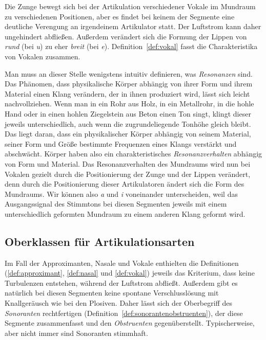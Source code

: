 Die Zunge bewegt sich bei der Artikulation verschiedener Vokale im Mund\-raum zu verschiedenen Positionen, aber es findet bei keinem der Segmente eine deutliche Verengung an irgendeinem Artikulator statt.
Der Luftstrom kann daher ungehindert abfließen.
Außerdem verändert sich die Formung der Lippen von \textit{rund} (\zB bei \textit{u}) zu eher \textit{breit} (\zB bei \textit{e}).
Definition~\ref{def:vokal} fasst die Charakteristika von Vokalen zusammen.


Man muss an dieser Stelle wenigstens intuitiv definieren, was \textit{Resonanzen} sind.
Das Phänomen, dass physikalische Körper abhängig von ihrer Form und ihrem Material einen Klang verändern, der in ihnen produziert wird, lässt sich leicht nachvollziehen.
Wenn man in ein Rohr aus Holz, in ein Metallrohr, in die hohle Hand oder in einen hohlen Ziegelstein aus Beton einen Ton singt, klingt dieser jeweils unterschiedlich, auch wenn die zugrundeliegende Tonhöhe gleich bleibt.
Das liegt daran, dass ein physikalischer Körper abhängig von seinem Material, seiner Form und Größe bestimmte Frequenzen eines Klangs verstärkt und abschwächt.
Körper haben also ein charakteristisches \textit{Resonanzverhalten} abhängig von Form und Material.
Das Resonanzverhalten des Mundraums wird nun bei Vokalen gezielt durch die Positionierung der Zunge und der Lippen verändert, denn durch die Positionierung dieser Artikulatoren ändert sich die Form des Mundraums.
Wir können also \textit{a} und \textit{i} voneinander unterscheiden, weil das Ausgangssignal des Stimmtons bei diesen Segmenten jeweils mit einem unterschiedlich geformten Mundraum zu einem anderen Klang geformt wird.

\subsection{Oberklassen für Artikulationsarten}
\label{sec:oberklassenfuerartikulationsarten}

Im Fall der Approximanten, Nasale und Vokale enthielten die Definitionen (\ref{def:approximant}, \ref{def:nasal} und \ref{def:vokal}) jeweils das Kriterium, dass keine Turbulenzen entstehen, während der Luftstrom abfließt.
Außerdem gibt es natürlich bei diesen Segmenten keine spontane Verschlusslösung mit Knallgeräusch wie bei den Plosiven.
Daher lässt sich der Oberbegriff des \textit{Sonoranten} rechtfertigen (Definition~\ref{def:sonorantenobstruenten}), der diese Segmente zusammenfasst und den \textit{Obstruenten} gegenüberstellt.
Typischerweise, aber nicht immer sind Sonoranten stimmhaft.

